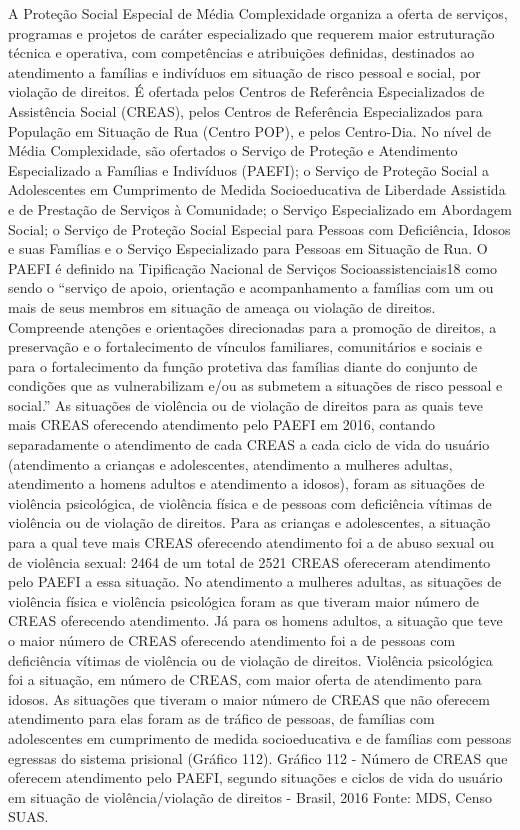 \documentclass[
  brazilian]{report}
\begin{document}
A Proteção Social Especial de Média Complexidade organiza a oferta de
serviços, programas e projetos de caráter especializado que requerem
maior estruturação técnica e operativa, com competências e atribuições
definidas, destinados ao atendimento a famílias e indivíduos em situação
de risco pessoal e social, por violação de direitos. É ofertada pelos
Centros de Referência Especializados de Assistência Social (CREAS),
pelos Centros de Referência Especializados para População em Situação de
Rua (Centro POP), e pelos Centro-Dia. No nível de Média Complexidade,
são ofertados o Serviço de Proteção e Atendimento Especializado a
Famílias e Indivíduos (PAEFI); o Serviço de Proteção Social a
Adolescentes em Cumprimento de Medida Socioeducativa de Liberdade
Assistida e de Prestação de Serviços à Comunidade; o Serviço
Especializado em Abordagem Social; o Serviço de Proteção Social Especial
para Pessoas com Deficiência, Idosos e suas Famílias e o Serviço
Especializado para Pessoas em Situação de Rua. O PAEFI é definido na
Tipificação Nacional de Serviços Socioassistenciais18 como sendo o
``serviço de apoio, orientação e acompanhamento a famílias com um ou
mais de seus membros em situação de ameaça ou violação de direitos.
Compreende atenções e orientações direcionadas para a promoção de
direitos, a preservação e o fortalecimento de vínculos familiares,
comunitários e sociais e para o fortalecimento da função protetiva das
famílias diante do conjunto de condições que as vulnerabilizam e/ou as
submetem a situações de risco pessoal e social.'' As situações de
violência ou de violação de direitos para as quais teve mais CREAS
oferecendo atendimento pelo PAEFI em 2016, contando separadamente o
atendimento de cada CREAS a cada ciclo de vida do usuário (atendimento a
crianças e adolescentes, atendimento a mulheres adultas, atendimento a
homens adultos e atendimento a idosos), foram as situações de violência
psicológica, de violência física e de pessoas com deficiência vítimas de
violência ou de violação de direitos. Para as crianças e adolescentes, a
situação para a qual teve mais CREAS oferecendo atendimento foi a de
abuso sexual ou de violência sexual: 2464 de um total de 2521 CREAS
ofereceram atendimento pelo PAEFI a essa situação. No atendimento a
mulheres adultas, as situações de violência física e violência
psicológica foram as que tiveram maior número de CREAS oferecendo
atendimento. Já para os homens adultos, a situação que teve o maior
número de CREAS oferecendo atendimento foi a de pessoas com deficiência
vítimas de violência ou de violação de direitos. Violência psicológica
foi a situação, em número de CREAS, com maior oferta de atendimento para
idosos. As situações que tiveram o maior número de CREAS que não
oferecem atendimento para elas foram as de tráfico de pessoas, de
famílias com adolescentes em cumprimento de medida socioeducativa e de
famílias com pessoas egressas do sistema prisional (Gráfico 112).
Gráfico 112 - Número de CREAS que oferecem atendimento pelo PAEFI,
segundo situações e ciclos de vida do usuário em situação de
violência/violação de direitos - Brasil, 2016 Fonte: MDS, Censo SUAS.
\end{document}
